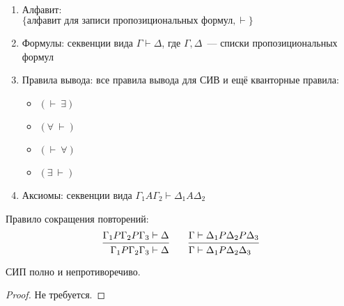 \documentclass[main]{subfiles}
\begin{document}
\begin{definition}
    \

    \begin{enumerate}
        \item Алфавит: \\
              $\{\text{алфавит для записи пропозициональных формул}, \vdash\}$
        \item Формулы: секвенции вида $\Gamma \vdash \Delta$,  где $\Gamma, \Delta$~--- списки пропозициональных формул
        \item Правила вывода: все правила вывода для СИВ и ещё кванторные правила:
              \begin{itemize}
                  \item $(\vdash \ \exists)$
                  \item $(\forall \ \vdash)$
                  \item $(\vdash \ \forall)$
                  \item $(\exists \ \vdash)$
              \end{itemize}
        \item Аксиомы: секвенции вида $\Gamma_1 A \Gamma_2 \vdash \Delta_1 A \Delta_2$
    \end{enumerate}
\end{definition}
Правило сокращения повторений:
\begin{gather*}
    \begin{prooftree}
        \hypo{\Gamma_1 P \Gamma_2 P \Gamma_3 & \vdash \Delta}
        \infer1{\Gamma_1 P \Gamma_2 \Gamma_3 & \vdash \Delta}
    \end{prooftree} \qquad
    \begin{prooftree}
        \hypo{\Gamma & \vdash \Delta_1 P \Delta_2 P \Delta_3}
        \infer1{\Gamma &\vdash \Delta_1 P \Delta_2 \Delta_3}
    \end{prooftree}
\end{gather*}
\begin{theorem}
    СИП полно и непротиворечиво.
\end{theorem}
\begin{proof}
    Не требуется.
\end{proof}
\end{document}
